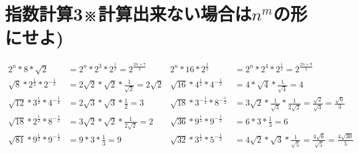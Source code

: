 \documentclass[paper=b4j,landscape,twocolumn,fleqn]{jlreq}
\begin{document}
\section{指数計算3※計算出来ない場合は$n^m$の形にせよ)}
\begin{align*}
  2^n*8*\sqrt{2} &=2^n*2^3*2^{\frac{1}{2}}=2^{\frac{2n+7}{2}}
  & 2^{n}*16*2^{\frac{1}{2}}&= 2^n*2^4*2^{\frac{1}{2}}=2^{\frac{2n+9}{2}}\\
  \sqrt{8}*2^{\frac{1}{2}}*2^{-\frac{1}{2}} &= 2\sqrt{2}*\sqrt{2}*\frac{1}{\sqrt{2}} =  2\sqrt{2}
  & \sqrt{16}*4^{\frac{1}{2}}*4^{-\frac{1}{2}}&=4*\sqrt{4}*\frac{1}{\sqrt{4}} = 4\\
  \sqrt{12}*3^{\frac{1}{2}}*4^{-\frac{1}{2}} &= 2\sqrt{3} *\sqrt{3}*\frac{1}{2}=3
  & \sqrt{18}*3^{-\frac{1}{2}}*8^{-\frac{1}{2}}&= 3\sqrt{2}*\frac{1}{\sqrt{3}}*\frac{1}{2\sqrt{2}}=\frac{\sqrt{2}}{\sqrt{3}}=\frac{\sqrt{6}}{3}\\
  \sqrt{18}*2^{\frac{1}{2}}*8^{-\frac{1}{2}} &= 3\sqrt{2}*\sqrt{2}*\frac{1}{2\sqrt{2}}=2
  & \sqrt{36}*9^{\frac{1}{2}}*9^{-\frac{1}{2}}&= 6*3*\frac{1}{3}=6\\
  \sqrt{81}*9^{\frac{1}{2}}*9^{-\frac{1}{2}} &= 9*3*\frac{1}{3}= 9
  & \sqrt{32}*3^{\frac{1}{2}}*5^{-\frac{1}{2}}&= 4\sqrt{2}*\sqrt{3}*\frac{1}{\sqrt{5}}=\frac{4\sqrt{6}}{\sqrt{5}}=\frac{4\sqrt{30}}{5}\\
\end{align*}
\end{document}
